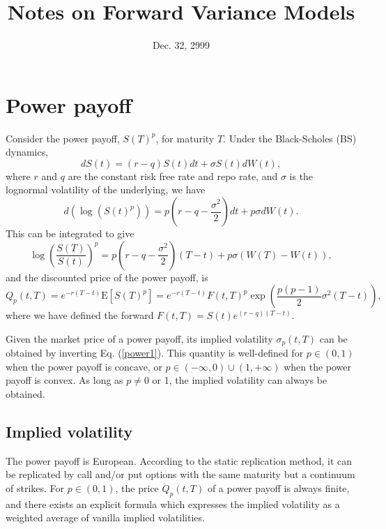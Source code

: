 \documentclass[12pt]{article}
\begin{document}
\title{Notes on Forward Variance Models}
\date{Dec. 32, 2999}

\maketitle

\section{Power payoff}

  Consider the power payoff, $S(T)^p$, for maturity $T$. Under the Black-Scholes (BS) dynamics,
  \begin{equation}
    dS(t) = (r-q)S(t)dt+\sigma S(t)dW(t),
  \end{equation}
  where $r$ and $q$ are the constant risk free rate and repo rate, and $\sigma$ is the lognormal volatility of the
  underlying, we have
  \begin{equation}
    d\left(\log\left(S(t)^p\right)\right) = p\left(r-q-\frac{\sigma ^2}{2}\right)dt + p\sigma dW(t).
  \end{equation}
  This can be integrated to give
  \begin{equation}
    \log\left(\frac{S(T)}{S(t)}\right)^p = p\left(r-q-\frac{\sigma ^2}{2}\right)(T-t) + p\sigma\left(W(T)-W(t)\right),
  \end{equation}
  and the discounted price of the power payoff, is
  \begin{equation}
    Q_p(t,T)=e^{-r(T-t)}{\mathrm E}\left[S(T)^p\right]=e^{-r(T-t)}F(t,T)^p\exp\left(\frac{p(p-1)}{2}\sigma^2(T-t)\right),
    \label{power1}
  \end{equation}
  where we have defined the forward $F(t,T)=S(t)e^{(r-q)(T-t)}$.

  Given the market price of a power payoff, its implied volatility $\sigma_p(t,T)$ can be obtained by inverting
  Eq. (\ref{power1}). This quantity is well-defined for $p\in (0,1)$ when the power payoff is concave, or
  $p\in (-\infty, 0)\cup (1,+\infty)$ when the power payoff is convex. As long as $p\neq 0$ or 1, the implied volatility
  can always be obtained.

  \subsection{Implied volatility}

    The power payoff is European. According to the static replication method, it can be replicated by call and/or
    put options with the same maturity but a continuum of strikes. For $p\in (0,1)$, the price $Q_p(t,T)$ of a power payoff
    is always finite, and there exists an explicit formula which expresses the implied volatility as a weighted average of
    vanilla implied volatilities.
\end{document}
